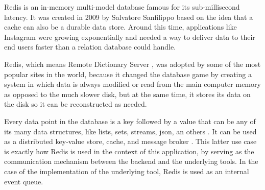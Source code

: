 Redis is an in-memory multi-model database famous for its sub-millisecond
latency. It was created in 2009 by Salvatore Sanfilippo \cite{redis-creator}
based on the idea that a cache can also be a durable data store. Around this
time, applications like Instagram \cite{redis-popular} were growing
exponentially and needed a way to deliver data to their end users faster than a
relation database could handle.

Redis, which means Remote Dictionary Server \cite{redis-meaning}, was adopted
by some of the most popular sites in the world, because it changed the database
game by creating a system in which data is always modified or read from the
main computer memory as opposed to the much slower disk, but at the same time,
it stores its data on the disk so it can be reconstructed as needed.

Every data point in the database is a key followed by a value that can be any
of its many data structures, like lists, sets, streams, json, an others
\cite{redis-data-types}. It can be used as a distributed key-value store,
cache, and message broker \cite{redis-usage}. This latter use case is exactly
how Redis is used in the context of this application, by serving as the
communication mechanism between the backend and the underlying tools. In the
case of the implementation of the underlying tool, Redis is used as an internal
event queue.
